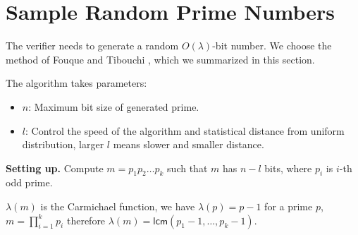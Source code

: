 \section{Sample Random Prime Numbers}

The verifier needs to generate a random $O(\lambda)$-bit number. We choose the method of Fouque and Tibouchi \cite{fouque2014close}, which we summarized in this section.

The algorithm takes parameters:
\begin{itemize}
    \item $n$: Maximum bit size of generated prime.
    \item $l$: Control the speed of the algorithm and statistical distance from uniform distribution, larger $l$ means slower and smaller distance.
\end{itemize}

\textbf{Setting up.} Compute $m = p_1 p_2 \dots p_k$ such that $m$ has $n - l$ bits, where $p_i$ is $i$-th odd prime.


$\lambda(m)$ is the Carmichael function, we have $\lambda(p) = p - 1$ for a prime $p$, $m = \prod_{i=1}^k p_i$ therefore $\lambda(m) = \mathsf{lcm}(p_1 - 1,\dots,p_k - 1)$.

